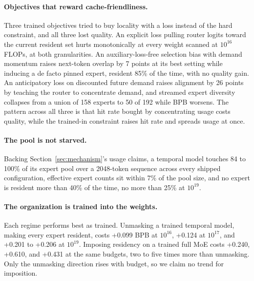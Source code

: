 \documentclass{article}
\begin{document}
\paragraph{Objectives that reward cache-friendliness.} Three trained objectives tried to
buy locality with a loss instead of the hard constraint, and all three lost quality. An
explicit loss pulling router logits toward the current resident set hurts monotonically at
every weight scanned at $10^{16}$ FLOPs, at both granularities. An auxiliary-loss-free
selection bias with demand momentum raises next-token overlap by 7 points at its best
setting while inducing a de facto pinned expert, resident 85\% of the time, with no quality
gain. An anticipatory loss on discounted future demand raises alignment by 26 points by
teaching the router to concentrate demand, and streamed expert diversity collapses from a
union of 158 experts to 50 of 192 while BPB worsens. The pattern across all three is that
hit rate bought by concentrating usage costs quality, while the trained-in constraint
raises hit rate and spreads usage at once.

\paragraph{The pool is not starved.} Backing Section~\ref{sec:mechanism}'s usage claims, a
temporal model touches 84 to 100\% of its expert pool over a 2048-token sequence across
every shipped configuration, effective expert counts sit within 7\% of the pool size, and
no expert is resident more than 40\% of the time, no more than 25\% at $10^{19}$.

\paragraph{The organization is trained into the weights.} Each regime performs best as
trained. Unmasking a trained temporal model, making every expert resident, costs +0.099
BPB at $10^{16}$, +0.124 at $10^{17}$, and +0.201 to +0.206 at $10^{19}$. Imposing
residency on a trained full MoE costs +0.240, +0.610, and +0.431 at the same budgets, two
to five times more than unmasking. Only the unmasking direction rises with budget, so we
claim no trend for imposition.
\end{document}
